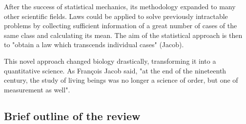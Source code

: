 After the success of statistical mechanics, its methodology expanded to many other scientific fields.
Laws could be applied to solve previously intractable problems by collecting sufficient information of a great number of cases of the same class and calculating its mean. The aim of the statistical approach is then to "obtain a law which transcends individual cases" (Jacob).

This novel approach changed biology drastically, transforming it into a quantitative science. As Fran\c{c}ois Jacob said, "at the end of the nineteenth century, the study of living beings was no longer a science of order, but one of measurement as well".



\subsection{Brief outline of the review}

